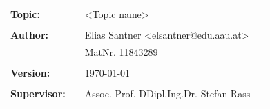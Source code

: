 \begin{center}
\doublespacing
\textbf{\LARGE{\titleDocument}}\\
\singlespacing
\begin{verbatim}

\end{verbatim}
\textbf{{~\subjectDocument}}
\end{center}
\begin{verbatim}

\end{verbatim}
\begin{center}

\end{center}
\begin{verbatim}

\end{verbatim}
\begin{center}
\end{center}
\begin{verbatim}






\end{verbatim}
\begin{flushleft}
\begin{tabular}{llll}
\textbf{Topic:} & & <Topic name> & \\
& & \\
\textbf{Author:} & & Elias Santner <elsantner@edu.aau.at>& \\
& & MatNr. 11843289 & \\
& & \\
\textbf{Version:} & & \today &\\
& & \\
\textbf{Supervisor:} & & Assoc. Prof. DDipl.Ing.Dr. Stefan Rass &\\
\end{tabular}
\end{flushleft}
